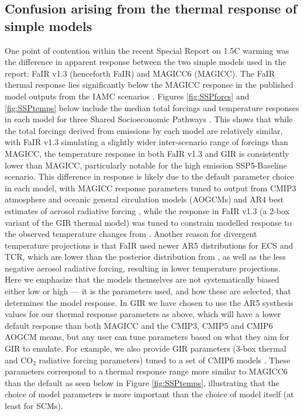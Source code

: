 \documentclass[gmd, manuscript]{copernicus}
\begin{document}
\subsection*{Confusion arising from the thermal response of simple models}
One point of contention within the recent Special Report on 1.5\textdegree C warming \citep{IPCC2018} was the difference in apparent response between the two simple models used in the report: FaIR v1.3 (henceforth FaIR) and MAGICC6 (MAGICC). The FaIR thermal response lies significantly below the MAGICC response in the published model outputs from the IAMC scenarios \citep{Huppmann:2018:scenario-data}. Figures \ref{fig:SSPforcs} and \ref{fig:SSPtemps} below include the median total forcings and temperature responses in each model for three Shared Socioeconomic Pathways \citep{Riahi2017}. This shows that while the total forcings derived from emissions by each model are relatively similar, with FaIR v1.3 simulating a slightly wider inter-scenario range of forcings than MAGICC, the temperature response in both FaIR v1.3 and GIR is consistently lower than MAGICC, particularly notable for the high emission SSP5-Baseline scenario. This difference in response is likely due to the default parameter choice in each model, with MAGICC response parameters tuned to output from CMIP3 atmosphere and oceanic general circulation models (AOGCMs) and AR4 best estimates of aerosol radiative forcing  \citep{Meinshausen2011}, while the response in FaIR v1.3 (a 2-box variant of the GIR thermal model) was tuned to constrain modelled response to the observed temperature changes from \cite{Cowtan2014} \citep{Smith2017}. Another reason for divergent temperature projections is that FaIR used newer AR5 distributions for ECS and TCR, which are lower than the posterior distribution from \cite{Meinshausen2009}, as well as the  less negative aerosol radiative forcing, resulting in lower temperature projections. Here we emphasize that the models themselves are not systematically biased either low or high --- it is the parameters used, and how these are selected, that determines the model response. In GIR we have chosen to use the AR5 systhesis values for our thermal response parameters as above, which will have a lower default response than both MAGICC and the CMIP3, CMIP5 and CMIP6 AOGCM means, but any user can tune parameters based on what they aim for GIR to emulate. For example, we also provide GIR parameters (3-box thermal and CO$_2$ radiative forcing parameters) tuned to a set of CMIP6 models \citep{Tsutsui2019}. These parameters correspond to a thermal response range more similar to MAGICC6 than the default as seen below in Figure \ref{fig:SSPtemps}, illustrating that the choice of model parameters is more important than the choice of model itself (at least for SCMs).
\end{document}
